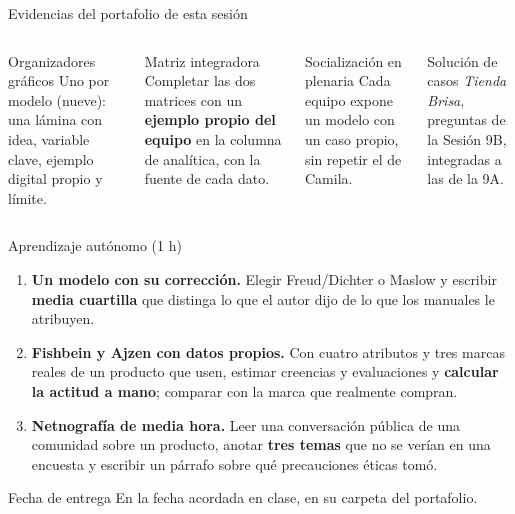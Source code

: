 \documentclass[aspectratio=169,xcolor=dvipsnames]{beamer}
\begin{document}
\begin{frame}{Evidencias del portafolio de esta sesión}
\small
\begin{columns}[T]
  \begin{block}{Organizadores gráficos}
    \scriptsize Uno por modelo (nueve): una lámina con idea, variable clave, ejemplo digital propio y límite.
  \end{block}
  \begin{block}{Matriz integradora}
    \scriptsize Completar las dos matrices con un \textbf{ejemplo propio del equipo} en la columna de analítica, con la fuente de cada dato.
  \end{block}
  \begin{block}{Socialización en plenaria}
    \scriptsize Cada equipo expone un modelo con un caso propio, sin repetir el de Camila.
  \end{block}
  \begin{block}{Solución de casos}
    \scriptsize \textit{Tienda Brisa}, preguntas de la Sesión 9B, integradas a las de la 9A.
  \end{block}
\end{columns}
\end{frame}

\begin{frame}{Aprendizaje autónomo (1 h)}
\footnotesize
\begin{enumerate}
  \item \textbf{Un modelo con su corrección.} Elegir Freud/Dichter o Maslow y escribir \textbf{media cuartilla} que distinga lo que el autor dijo de lo que los manuales le atribuyen.
  \vspace{2pt}
  \item \textbf{Fishbein y Ajzen con datos propios.} Con cuatro atributos y tres marcas reales de un producto que usen, estimar creencias y evaluaciones y \textbf{calcular la actitud a mano}; comparar con la marca que realmente compran.
  \vspace{2pt}
  \item \textbf{Netnografía de media hora.} Leer una conversación pública de una comunidad sobre un producto, anotar \textbf{tres temas} que no se verían en una encuesta y escribir un párrafo sobre qué precauciones éticas tomó.
\end{enumerate}
\vspace{2pt}
\begin{alertblock}{Fecha de entrega}
  En la fecha acordada en clase, en su carpeta del portafolio.
\end{alertblock}
\end{frame}
\end{document}
